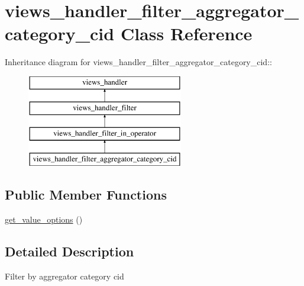 \hypertarget{classviews__handler__filter__aggregator__category__cid}{
\section{views\_\-handler\_\-filter\_\-aggregator\_\-category\_\-cid Class Reference}
\label{classviews__handler__filter__aggregator__category__cid}
}
Inheritance diagram for views\_\-handler\_\-filter\_\-aggregator\_\-category\_\-cid::\begin{figure}[H]
\begin{center}
\leavevmode
\includegraphics[height=4cm]{classviews__handler__filter__aggregator__category__cid}
\end{center}
\end{figure}
\subsection*{Public Member Functions}
\begin{DoxyCompactItemize}
\item 
\hyperlink{classviews__handler__filter__aggregator__category__cid_ad0fa87d5c7f9bcb955b163c6587cd790}{get\_\-value\_\-options} ()
\end{DoxyCompactItemize}


\subsection{Detailed Description}
Filter by aggregator category cid 

